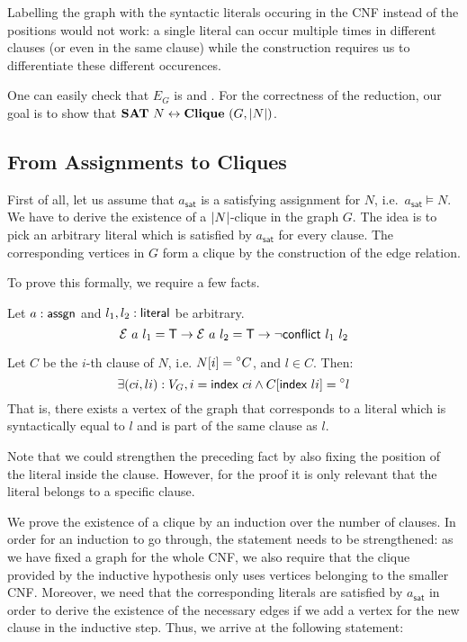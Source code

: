 \begin{remark}
  Labelling the graph with the syntactic literals occuring in the CNF instead of the positions would not work: a single literal can occur multiple times in different clauses (or even in the same clause) while the construction requires us to differentiate these different occurences. 
\end{remark}

One can easily check that $E_G$ is  and .
For the correctness of the reduction, our goal is to show that $\textbf{SAT}{}~N \leftrightarrow \textbf{Clique}{}~(G, |N|)$. 

\subsection{From Assignments to Cliques}
First of all, let us assume that $a_\textsf{sat}$ is a satisfying assignment for $N$, i.e.\ $a_\textsf{sat} \models N$. 
We have to derive the existence of a $|N|$-clique in the graph $G$. The idea is to pick an arbitrary literal which is satisfied by $a_\textsf{sat}$ for every clause. The corresponding vertices in $G$ form a clique by the construction of the edge relation. 

To prove this formally, we require a few facts. 
\begin{fact}\label{fact:literal_conflict}
  Let $a : \textsf{assgn}$ and $l_1, l_2 : \textsf{literal}$ be arbitrary. 
  \[\mathcal{E}~a~l_1 = \mathsf{T} \rightarrow \mathcal{E}~a~l_2 = \mathsf{T} \rightarrow \lnot \textsf{conflict}{}~l_1~l_2 \]
\end{fact}

\begin{fact}\label{fact:litInClause_exists_vertex}
  Let $C$ be the $i$-th clause of $N$, i.e. $N[i] = \prescript{\circ}{}C$, and $l \in C$. Then:
  \[\exists (ci,li) : V_G, i = \textsf{index}~ci \land C[\textsf{index}~li] = \prescript{\circ}{}l\]
  That is, there exists a vertex of the graph that corresponds to a literal which is syntactically equal to $l$ and is part of the same clause as $l$.
\end{fact}
Note that we could strengthen the preceding fact by also fixing the position of the literal inside the clause. However, for the proof it is only relevant that the literal belongs to a specific clause.

We prove the existence of a clique by an induction over the number of clauses. In order for an induction to go through, the statement needs to be strengthened: as we have fixed a graph for the whole CNF, we also require that the clique provided by the inductive hypothesis only uses vertices belonging to the smaller CNF. Moreover, we need that the corresponding literals are satisfied by $a_{\textsf{sat}}$ in order to derive the existence of the necessary edges if we add a vertex for the new clause in the inductive step. Thus, we arrive at the following statement:

